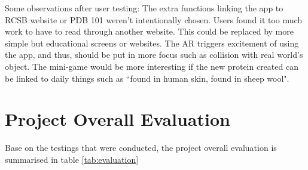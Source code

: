 Some observations after user testing: The extra functions linking the app to RCSB website or PDB 101 weren't intentionally chosen. Users found it too much work to have to read through another website. This could be replaced by more simple but educational screens or websites. The AR triggers excitement of using the app, and thus, should be put in more focus such as collision with real world's object. The mini-game would be more interesting if the new protein created can be linked to daily things such as ``found in human skin, found in sheep wool". 

\section{Project Overall Evaluation}
Base on the testings that were conducted, the project overall evaluation is summarised in table \ref{tab:evaluation}

